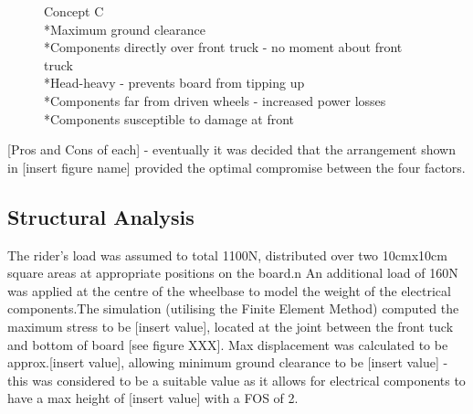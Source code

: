 \documentclass[journal,10pt]{IEEEtran}
\begin{document}
        \begin{figure}[H]
                \centering
                \caption{Concept C
                \\*Maximum ground clearance
                \\*Components directly over front truck - no moment about front truck
                \\*Head-heavy - prevents board from tipping up
                \\*Components far from driven wheels - increased power losses
                \\*Components susceptible to damage at front}
                \label{fig:ConceptC}
            \end{figure} 
        [Pros and Cons of each] - eventually it was decided that the arrangement shown in [insert figure name] provided the optimal compromise between the four factors.
    \subsection{Structural Analysis}
        The rider's load was assumed to total 1100N, distributed over two 10cmx10cm square areas at appropriate positions on the board.n An additional load of 160N was applied at the centre of the wheelbase to model the weight of the electrical components.The simulation (utilising the Finite Element Method) computed the maximum stress to be [insert value], located at the joint between the front tuck and bottom of board [see figure XXX]. Max displacement was calculated to be approx.[insert value], allowing minimum ground clearance to be [insert value] - this was considered to be a suitable value as it allows for electrical components to have a max height of [insert value] with a FOS of 2.
    
\end{document}
